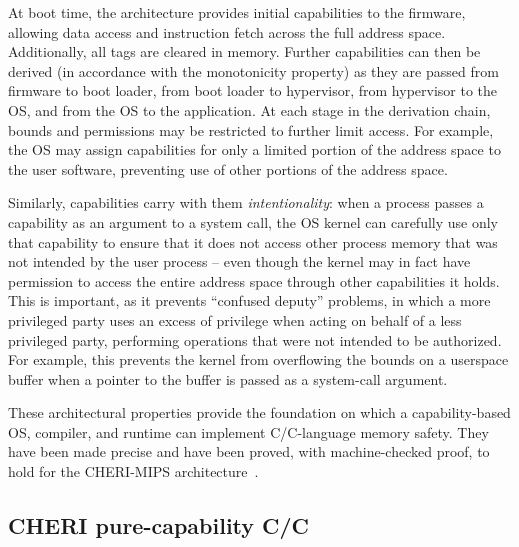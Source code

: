 \documentclass[12pt,twoside,openright,usletter]{article}
\newcommand{\note}[2]{{\color{blue}[ Note: #1 - #2]}}
\renewcommand{\note}[2]{\relax\ifhmode\unskip\fi}
\newcommand{\rwnote}[1]{\note{#1}{Robert W.}}
\newcommand{\pgnnote}[1]{\note{#1}{Peter N.}}
\newcommand*{\cpp}[1][]{C\textsmaller[2]{\nolinebreak[4]\hspace{-.05em}\raisebox{.45ex}{\textbf{++}}}}
\newcommand*{\cppInHeader}[1][]{\texorpdfstring{\cpp{}}{C++}}
\begin{document}
At boot time, the architecture provides initial capabilities to the firmware,
allowing data access and instruction fetch across the full address space.
Additionally, all tags are cleared in memory.
Further capabilities can then be derived (in accordance with the monotonicity
property) as they are passed from firmware to boot loader, from boot loader to
hypervisor, from hypervisor to the OS, and from the OS to the application.
At each stage in the derivation chain, bounds and permissions may be
restricted to further limit access.
For example, the OS may assign capabilities for only a limited portion of the
address space to the user software, preventing use of other portions of the
address space.



Similarly, capabilities carry with them \textit{intentionality}: when a
process passes a capability as an argument to a system call, the OS kernel can
carefully use only that capability to ensure that it does not access other
process memory that was not intended by the user process -- even though the
kernel may in fact have permission to access the entire address space through
other capabilities it holds.
This is important, as it prevents ``confused deputy'' problems, in which a more
privileged party uses an excess of privilege when acting on behalf of a less
privileged party, performing operations that were not intended to be
authorized.
For example, this prevents the kernel from overflowing the bounds on a
userspace buffer when a pointer to the buffer is passed as a
system-call argument.

These architectural properties provide the foundation on which a
capability-based OS, compiler, and runtime can implement C/\cpp{}-language memory
safety.
They have been made precise and have been proved, with machine-checked proof,
to hold for the CHERI-MIPS architecture~\cite{cheri-formal-SP2020}.


\subsection{CHERI pure-capability C/\cppInHeader{}}
\end{document}

